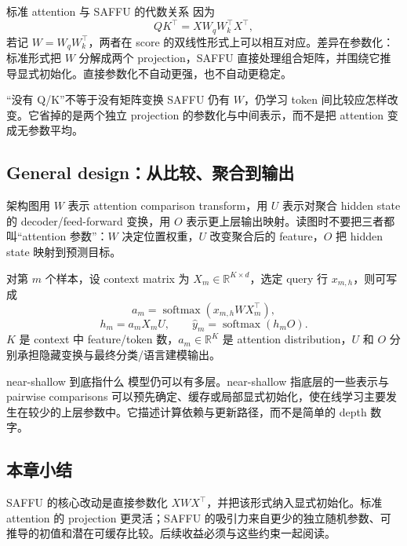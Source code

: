 \begin{importantbox}{标准 attention 与 SAFFU 的代数关系}
因为
\[
QK^\top=XW_qW_k^\top X^\top,
\]
若记 $W=W_qW_k^\top$，两者在 score 的双线性形式上可以相互对应。差异在参数化：标准形式把 $W$ 分解成两个 projection，SAFFU 直接处理组合矩阵，并围绕它推导显式初始化。直接参数化不自动更强，也不自动更稳定。
\end{importantbox}

\begin{warningbox}{“没有 Q/K”不等于没有矩阵变换}
SAFFU 仍有 $W$，仍学习 token 间比较应怎样改变。它省掉的是两个独立 projection 的参数化与中间表示，而不是把 attention 变成无参数平均。
\end{warningbox}


\subsection{General design：从比较、聚合到输出}

架构图用 $W$ 表示 attention comparison transform，用 $U$ 表示对聚合 hidden state 的 decoder/feed-forward 变换，用 $O$ 表示更上层输出映射。读图时不要把三者都叫“attention 参数”：$W$ 决定位置权重，$U$ 改变聚合后的 feature，$O$ 把 hidden state 映射到预测目标。


对第 $m$ 个样本，设 context matrix 为 $X_m\in\mathbb{R}^{K\times d}$，选定 query 行 $x_{m,h}$，则可写成
\[
a_m=\operatorname{softmax}(x_{m,h}WX_m^\top),
\]
\[
h_m=a_mX_mU,\qquad \hat y_m=\operatorname{softmax}(h_mO).
\]
$K$ 是 context 中 feature/token 数，$a_m\in\mathbb{R}^{K}$ 是 attention distribution，$U$ 和 $O$ 分别承担隐藏变换与最终分类/语言建模输出。

\begin{knowledgebox}{near-shallow 到底指什么}
模型仍可以有多层。near-shallow 指底层的一些表示与 pairwise comparisons 可以预先确定、缓存或局部显式初始化，使在线学习主要发生在较少的上层参数中。它描述计算依赖与更新路径，而不是简单的 depth 数字。
\end{knowledgebox}


\subsection{本章小结}

SAFFU 的核心改动是直接参数化 $XWX^\top$，并把该形式纳入显式初始化。标准 attention 的 projection 更灵活；SAFFU 的吸引力来自更少的独立随机参数、可推导的初值和潜在可缓存比较。后续收益必须与这些约束一起阅读。

